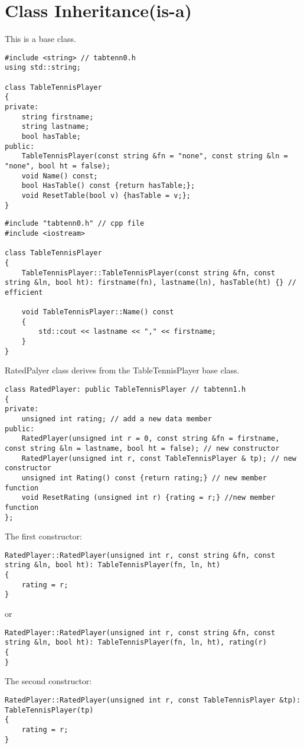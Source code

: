 \documentclass[10pt,a4paper,oneside]{article}
\begin{document}
\section{Class Inheritance(is-a)}
This is a base class.
\begin{lstlisting}
#include <string> // tabtenn0.h
using std::string;

class TableTennisPlayer
{
private:
    string firstname;
    string lastname;
    bool hasTable;
public:
    TableTennisPlayer(const string &fn = "none", const string &ln = "none", bool ht = false);
    void Name() const;
    bool HasTable() const {return hasTable;};
    void ResetTable(bool v) {hasTable = v;};
}
\end{lstlisting}
\begin{lstlisting}
#include "tabtenn0.h" // cpp file
#include <iostream>

class TableTennisPlayer
{
    TableTennisPlayer::TableTennisPlayer(const string &fn, const string &ln, bool ht): firstname(fn), lastname(ln), hasTable(ht) {} // efficient
    
    void TableTennisPlayer::Name() const
    {
        std::cout << lastname << "," << firstname;
    }
}
\end{lstlisting}
RatedPalyer class derives from the TableTennisPlayer base class.
\begin{lstlisting}
class RatedPlayer: public TableTennisPlayer // tabtenn1.h
{
private:
    unsigned int rating; // add a new data member
public:
    RatedPlayer(unsigned int r = 0, const string &fn = firstname, const string &ln = lastname, bool ht = false); // new constructor
    RatedPlayer(unsigned int r, const TableTennisPlayer & tp); // new constructor
    unsigned int Rating() const {return rating;} // new member function
    void ResetRating (unsigned int r) {rating = r;} //new member function
};
\end{lstlisting}
The first constructor:
\begin{lstlisting}
RatedPlayer::RatedPlayer(unsigned int r, const string &fn, const string &ln, bool ht): TableTennisPlayer(fn, ln, ht)
{
    rating = r;
}
\end{lstlisting}
or
\begin{lstlisting}
RatedPlayer::RatedPlayer(unsigned int r, const string &fn, const string &ln, bool ht): TableTennisPlayer(fn, ln, ht), rating(r)
{
}
\end{lstlisting}
The second constructor:
\begin{lstlisting}
RatedPlayer::RatedPlayer(unsigned int r, const TableTennisPlayer &tp): TableTennisPlayer(tp)
{
    rating = r;
}
\end{lstlisting}
\end{document}
